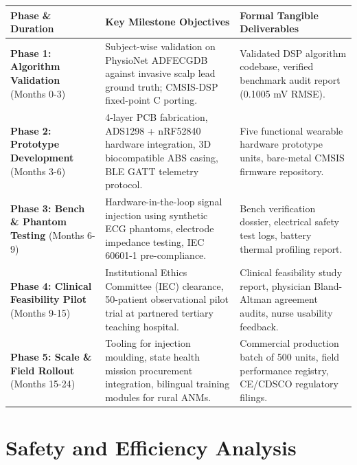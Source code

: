 \documentclass[10pt,a4paper]{article}
\begin{document}
\noindent
\begin{tabularx}{\textwidth}{lXX}
\toprule
\textbf{Phase \& Duration} & \textbf{Key Milestone Objectives} & \textbf{Formal Tangible Deliverables} \\
\midrule
\textbf{Phase 1: Algorithm Validation} (Months 0-3) & Subject-wise validation on PhysioNet ADFECGDB against invasive scalp lead ground truth; CMSIS-DSP fixed-point C porting. & Validated DSP algorithm codebase, verified benchmark audit report (0.1005 mV RMSE). \\
\addlinespace
\textbf{Phase 2: Prototype Development} (Months 3-6) & 4-layer PCB fabrication, ADS1298 + nRF52840 hardware integration, 3D biocompatible ABS casing, BLE GATT telemetry protocol. & Five functional wearable hardware prototype units, bare-metal CMSIS firmware repository. \\
\addlinespace
\textbf{Phase 3: Bench \& Phantom Testing} (Months 6-9) & Hardware-in-the-loop signal injection using synthetic ECG phantoms, electrode impedance testing, IEC 60601-1 pre-compliance. & Bench verification dossier, electrical safety test logs, battery thermal profiling report. \\
\addlinespace
\textbf{Phase 4: Clinical Feasibility Pilot} (Months 9-15) & Institutional Ethics Committee (IEC) clearance, 50-patient observational pilot trial at partnered tertiary teaching hospital. & Clinical feasibility study report, physician Bland-Altman agreement audits, nurse usability feedback. \\
\addlinespace
\textbf{Phase 5: Scale \& Field Rollout} (Months 15-24) & Tooling for injection moulding, state health mission procurement integration, bilingual training modules for rural ANMs. & Commercial production batch of 500 units, field performance registry, CE/CDSCO regulatory filings. \\
\bottomrule
\end{tabularx}

\clearpage

\section{Safety and Efficiency Analysis}
\end{document}
